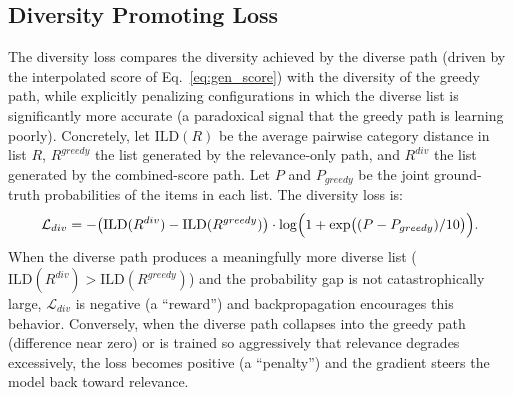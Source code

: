 \subsection{Diversity Promoting Loss}
\label{sec:diversity}
The diversity loss compares the diversity achieved by the diverse path (driven by the interpolated score of Eq.~\ref{eq:gen_score}) with the diversity of the greedy path, while explicitly penalizing configurations in which the diverse list is significantly more accurate (a paradoxical signal that the greedy path is learning poorly). Concretely, let $\text{ILD}(R)$ be the average pairwise category distance in list $R$, $R^{greedy}$ the list generated by the relevance-only path, and $R^{div}$ the list generated by the combined-score path. Let $P$ and $P_{greedy}$ be the joint ground-truth probabilities of the items in each list. The diversity loss is:
\begin{equation}
\label{eq:div_loss}
\mathcal{L}_{div} = -\bigl(\text{ILD}(R^{div}) - \text{ILD}(R^{greedy})\bigr)
                   \cdot \log\Bigl(1 + \exp\bigl((P - P_{greedy}) / 10\bigr)\Bigr).
\end{equation}
When the diverse path produces a meaningfully more diverse list ($\text{ILD}(R^{div}) > \text{ILD}(R^{greedy})$) and the probability gap is not catastrophically large, $\mathcal{L}_{div}$ is negative (a ``reward'') and backpropagation encourages this behavior. Conversely, when the diverse path collapses into the greedy path (difference near zero) or is trained so aggressively that relevance degrades excessively, the loss becomes positive (a ``penalty'') and the gradient steers the model back toward relevance.

